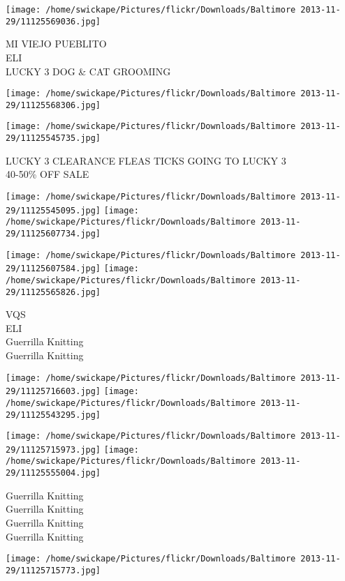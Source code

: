 \documentclass[10pt,letterpaper]{article}
\begin{document}
\vspace{0.25in}
\texttt{[image: /home/swickape/Pictures/flickr/Downloads/Baltimore 2013-11-29/11125569036.jpg]}

MI VIEJO PUEBLITO\\
ELI\\
LUCKY 3 DOG \& CAT GROOMING
\pagebreak

\texttt{[image: /home/swickape/Pictures/flickr/Downloads/Baltimore 2013-11-29/11125568306.jpg]}

\vspace{0.25in}
\texttt{[image: /home/swickape/Pictures/flickr/Downloads/Baltimore 2013-11-29/11125545735.jpg]}

LUCKY 3 CLEARANCE FLEAS TICKS GOING TO LUCKY 3\\
40{-}50\% OFF SALE
\pagebreak

\texttt{[image: /home/swickape/Pictures/flickr/Downloads/Baltimore 2013-11-29/11125545095.jpg]}
\texttt{[image: /home/swickape/Pictures/flickr/Downloads/Baltimore 2013-11-29/11125607734.jpg]}

\texttt{[image: /home/swickape/Pictures/flickr/Downloads/Baltimore 2013-11-29/11125607584.jpg]}
\texttt{[image: /home/swickape/Pictures/flickr/Downloads/Baltimore 2013-11-29/11125565826.jpg]}

VQS\\
ELI\\
Guerrilla Knitting\\
Guerrilla Knitting
\pagebreak

\texttt{[image: /home/swickape/Pictures/flickr/Downloads/Baltimore 2013-11-29/11125716603.jpg]}
\texttt{[image: /home/swickape/Pictures/flickr/Downloads/Baltimore 2013-11-29/11125543295.jpg]}

\texttt{[image: /home/swickape/Pictures/flickr/Downloads/Baltimore 2013-11-29/11125715973.jpg]}
\texttt{[image: /home/swickape/Pictures/flickr/Downloads/Baltimore 2013-11-29/11125555004.jpg]}

Guerrilla Knitting\\
Guerrilla Knitting\\
Guerrilla Knitting\\
Guerrilla Knitting
\pagebreak

\texttt{[image: /home/swickape/Pictures/flickr/Downloads/Baltimore 2013-11-29/11125715773.jpg]}
\end{document}
